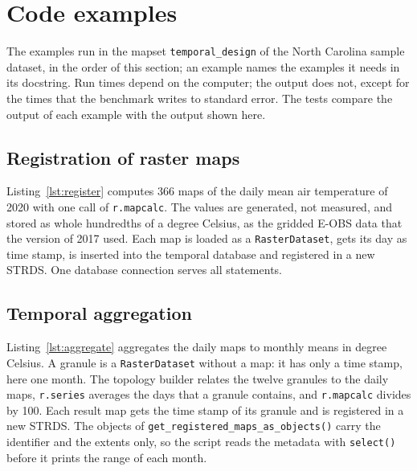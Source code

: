 \documentclass[10pt,a4paper]{article}
\makeatletter
\newcommand{\code}[1]{\texttt{#1}}
\newcommand{\attachmentdate}{D:20261106000000Z}
\DeclareRobustCommand{\examplefile}[1]{%
  \code{python/grass/docs/src/temporal\_framework\_design/examples/%
    \detokenize{#1}}\\
  attached to this PDF as \code{\detokenize{#1}}%
  \embedfileifobjectexists{\detokenize{#1}}{Filespec}{}{%
    \begingroup
    \def\pdf@filemoddate##1{\attachmentdate}%
    \embedfile[id=\detokenize{#1},filespec=\detokenize{#1},
      mimetype=text/x-python]{examples/\detokenize{#1}}%
    \endgroup}}
\makeatother
\begin{document}
\FloatBarrier
\section{Code examples}
\label{sec:examples}

The examples run in the mapset \code{temporal\_design} of the North Carolina
sample dataset, in the order of this section; an example names the examples
it needs in its docstring. Run times depend on the computer; the output does
not, except for the times that the benchmark writes to standard error. The
tests compare the output of each example with the output shown here.

\subsection{Registration of raster maps}

Listing~\ref{lst:register} computes 366 maps of the daily mean air
temperature of 2020 with one call of \code{r.mapcalc}. The values are
generated, not measured, and stored as whole hundredths of a degree Celsius,
as the gridded E-OBS data that the version of 2017 used. Each map is loaded as
a \code{RasterDataset}, gets its day as time stamp, is inserted into the
temporal database and registered in a new STRDS. One database connection
serves all statements.





\subsection{Temporal aggregation}

Listing~\ref{lst:aggregate} aggregates the daily maps to monthly means in
degree Celsius. A granule is a \code{RasterDataset} without a map: it has only
a time stamp, here one month. The topology builder relates the twelve granules
to the daily maps, \code{r.series} averages the days that a granule contains,
and \code{r.mapcalc} divides by 100. Each result map gets the time stamp of
its granule and is registered in a new STRDS. The objects of
\code{get\_registered\_maps\_as\_objects()} carry the identifier and the
extents only, so the script reads the metadata with \code{select()} before
it prints the range of each month.
\end{document}
